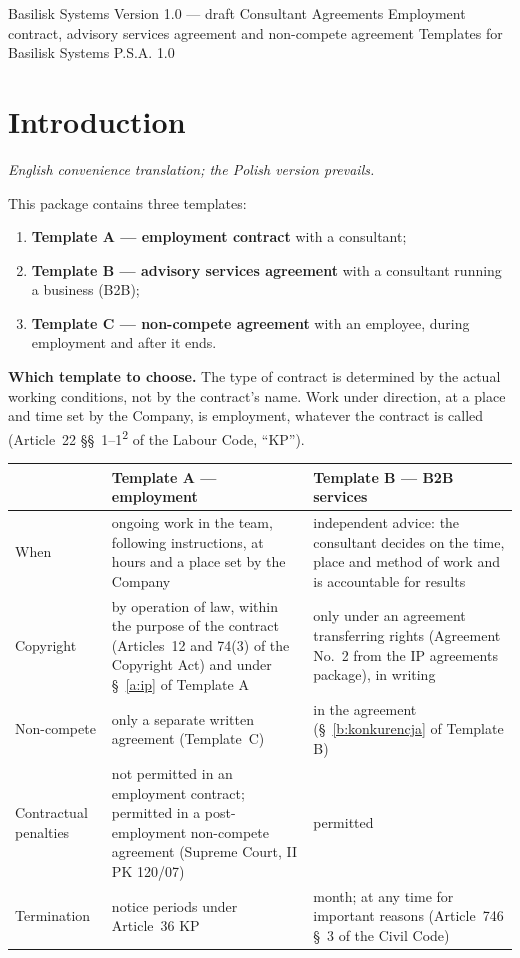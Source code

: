 \documentclass[11pt,a4paper]{report}
\begin{document}
\BusinessPlanTitlePage
  {Basilisk Systems}
  {Version 1.0 --- draft}
  {Consultant Agreements}
  {Employment contract, advisory services agreement and non-compete agreement}
  {Templates for Basilisk Systems P.S.A.}
  {1.0}

\tableofcontents
\newpage

\chapter*{Introduction}

{\small\itshape English convenience translation; the Polish version prevails.\par}

This package contains three templates:
\begin{enumerate}
  \item \textbf{Template A --- employment contract} with a consultant;
  \item \textbf{Template B --- advisory services agreement} with a consultant running a business (B2B);
  \item \textbf{Template C --- non-compete agreement} with an employee, during employment and after it ends.
\end{enumerate}

\textbf{Which template to choose.} The type of contract is determined by the actual working conditions, not by the contract's name. Work under direction, at a place and time set by the Company, is employment, whatever the contract is called (Article~22 \S\S~1--1\textsuperscript{2} of the Labour Code, ``KP'').

\begin{center}
\begin{tabularx}{\linewidth}{@{}>{\raggedright\arraybackslash}p{3.4cm} >{\raggedright\arraybackslash}X >{\raggedright\arraybackslash}X@{}}
\toprule
 & \textbf{Template A --- employment} & \textbf{Template B --- B2B services} \\
\midrule
When & ongoing work in the team, following instructions, at hours and a place set by the Company & independent advice: the consultant decides on the time, place and method of work and is accountable for results \\
Copyright & by operation of law, within the purpose of the contract (Articles~12 and 74(3) of the Copyright Act) and under \S~\ref{a:ip} of Template A & only under an agreement transferring rights (Agreement No.~2 from the IP agreements package), in writing \\
Non-compete & only a separate written agreement (Template~C) & in the agreement (\S~\ref{b:konkurencja} of Template B) \\
Contractual penalties & not permitted in an employment contract; permitted in a post-employment non-compete agreement (Supreme Court, II PK 120/07) & permitted \\
Termination & notice periods under Article~36 KP & 1 month; at any time for important reasons (Article~746 \S~3 of the Civil Code) \\
\bottomrule
\end{tabularx}
\end{center}
\end{document}
